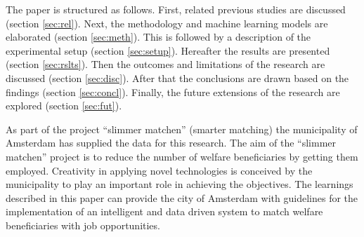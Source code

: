 The paper is structured as follows. First, related previous studies are discussed (section \ref{sec:rel}). Next, the methodology and machine learning models are elaborated (section \ref{sec:meth}). This is followed by a description of the experimental setup (section \ref{sec:setup}). Hereafter the results are presented (section \ref{sec:rslts}). Then the outcomes and limitations of the research are discussed (section \ref{sec:disc}). After that the conclusions are drawn based on the findings (section \ref{sec:concl}). Finally, the future extensions of the research are explored (section \ref{sec:fut}).

As part of the project “slimmer matchen” (smarter matching) the municipality of Amsterdam has supplied the data for this research. 
The aim of the “slimmer matchen”  project is to reduce the number of welfare beneficiaries by getting them employed.
Creativity in applying novel technologies is conceived by the municipality to play an important role in achieving the objectives.
The learnings described in this paper can provide the city of Amsterdam with guidelines for the implementation of an intelligent and data driven system to match welfare beneficiaries with job opportunities. 



